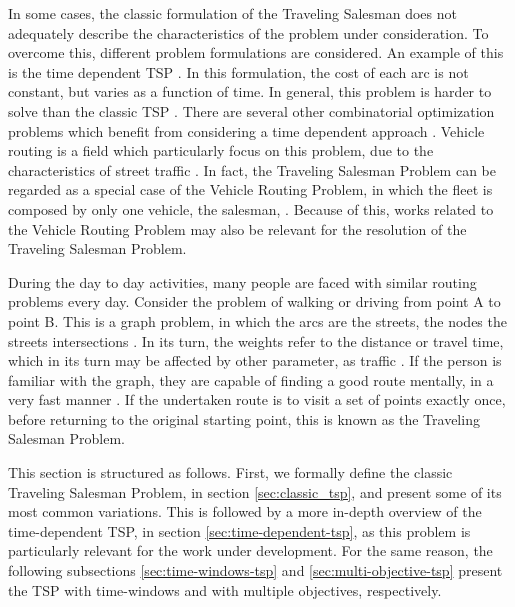 In some cases, the classic formulation of the Traveling Salesman does not adequately describe the characteristics of the problem under consideration. To overcome this, different problem formulations are considered. An example of this is the time dependent TSP \cite{cite_12}. In this formulation, the cost of each arc is not constant, but varies as a function of time. In general, this problem is harder to solve than the classic TSP \cite{cite_21}. There are several other combinatorial optimization problems which benefit from considering a time dependent approach \cite{cite_20}. Vehicle routing is a field which particularly focus on this problem, due to the characteristics of street traffic \cite{cite_19}. In fact, the Traveling Salesman Problem can be regarded as a special case of the Vehicle Routing Problem, in which the fleet is composed by only one vehicle, the salesman, \cite{cite_19}. Because of this, works related to the Vehicle Routing Problem may also be relevant for the resolution of the Traveling Salesman Problem.

During the day to day activities, many people are faced with similar routing problems every day. Consider the problem of walking or driving from point A to point B. This is a graph problem, in which the arcs are the streets, the nodes the streets intersections \cite{cite_11}. In its turn, the weights refer to the distance or travel time, which in its turn may be affected by other parameter, as traffic \cite{cite_12}. If the person is familiar with the graph, they are capable of finding a good route mentally, in a very fast manner \cite{cite_13}. If the undertaken route is to visit a set of points exactly once, before returning to the original starting point, this is known as the Traveling Salesman Problem. 

This section is structured as follows. First, we formally define the classic Traveling Salesman Problem, in section \ref{sec:classic_tsp}, and present some of its most common variations. This is followed by a more in-depth overview of the time-dependent TSP, in section \ref{sec:time-dependent-tsp}, as this problem is particularly relevant for the work under development. For the same reason, the following subsections \ref{sec:time-windows-tsp} and \ref{sec:multi-objective-tsp} present the TSP with time-windows and with multiple objectives, respectively.